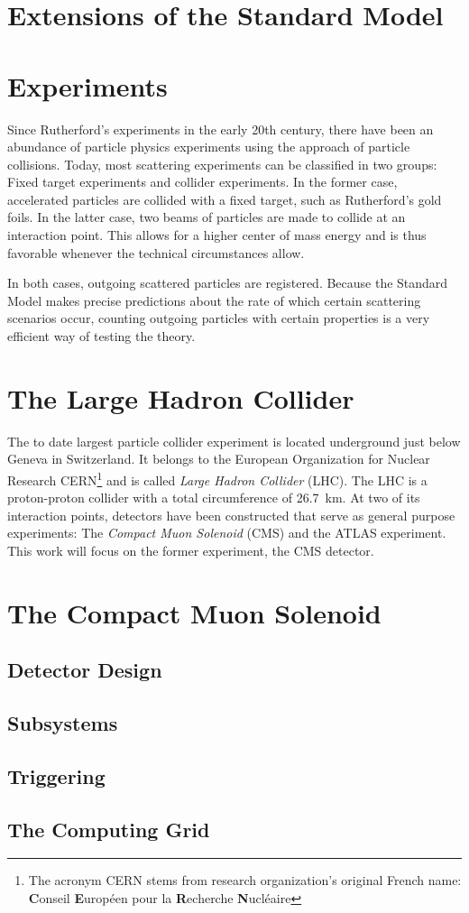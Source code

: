
\section{Extensions of the Standard Model}


\section{Experiments}
Since Rutherford's experiments in the early 20th century, there have been an abundance of particle physics experiments using the approach of particle collisions. Today, most scattering experiments can be classified in two groups: Fixed target experiments and collider experiments. In the former case, accelerated particles are collided with a fixed target, such as Rutherford's gold foils. In the latter case, two beams of particles are made to collide at an interaction point. This allows for a higher center of mass energy and is thus favorable whenever the technical circumstances allow.

In both cases, outgoing scattered particles are registered. Because the Standard Model makes precise predictions about the rate of which certain scattering scenarios occur, counting outgoing particles with certain properties is a very efficient way of testing the theory.

\section{The Large Hadron Collider}
The to date largest particle collider experiment is located underground just below Geneva in Switzerland. It belongs to the European Organization for Nuclear Research CERN\footnote{The acronym CERN stems from research organization's original French name: \textbf{C}onseil \textbf{E}uropéen pour la \textbf{R}echerche \textbf{N}ucléaire} and is called \emph{Large Hadron Collider} (LHC). The LHC is a proton-proton collider with a total circumference of \SI{26.7}{\km}. At two of its interaction points, detectors have been constructed that serve as general purpose experiments: The \emph{Compact Muon Solenoid} (CMS) and the ATLAS experiment\cite{Evans:LHCMachine}. 
This work will focus on the former experiment, the CMS detector.

\section{The Compact Muon Solenoid}



\subsection{Detector Design}
\subsection{Subsystems}
\subsection{Triggering}
\subsection{The Computing Grid}